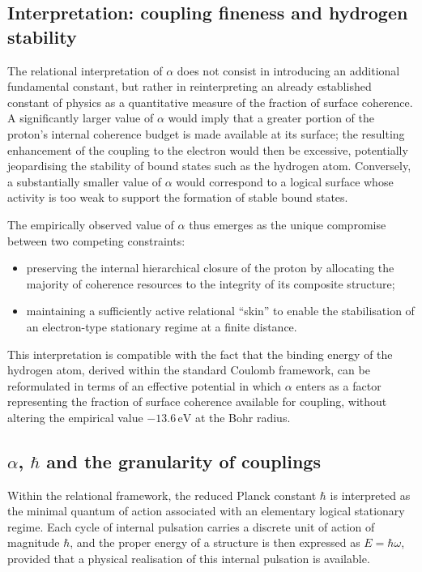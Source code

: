 \documentclass[11pt,a4paper]{article}
\begin{document}
\subsection{Interpretation: coupling fineness and hydrogen stability}
The relational interpretation of \(\alpha\) does not consist in introducing an additional fundamental constant, but rather in reinterpreting an already established constant of physics as a quantitative measure of the fraction of surface coherence. A significantly larger value of \(\alpha\) would imply that a greater portion of the proton’s internal coherence budget is made available at its surface; the resulting enhancement of the coupling to the electron would then be excessive, potentially jeopardising the stability of bound states such as the hydrogen atom. Conversely, a substantially smaller value of \(\alpha\) would correspond to a logical surface whose activity is too weak to support the formation of stable bound states.

The empirically observed value of \(\alpha\) thus emerges as the unique compromise between two competing constraints:
\begin{itemize}[label=-]
  \item preserving the internal hierarchical closure of the proton by allocating the majority of coherence resources to the integrity of its composite structure;
  \item maintaining a sufficiently active relational “skin” to enable the stabilisation of an electron-type stationary regime at a finite distance.
\end{itemize}
This interpretation is compatible with the fact that the binding energy of the hydrogen atom, derived within the standard Coulomb framework, can be reformulated in terms of an effective potential in which \(\alpha\) enters as a factor representing the fraction of surface coherence available for coupling, without altering the empirical value \(-13.6\,\mathrm{eV}\) at the Bohr radius.

\subsection{\texorpdfstring{\(\alpha\), \(\hbar\)}{alpha, hbar} and the granularity of couplings}

Within the relational framework, the reduced Planck constant \(\hbar\) is interpreted as the minimal quantum of action associated with an elementary logical stationary regime. Each cycle of internal pulsation carries a discrete unit of action of magnitude \(\hbar\), and the proper energy of a structure is then expressed as \(E = \hbar \omega\), provided that a physical realisation of this internal pulsation is available.
\end{document}
